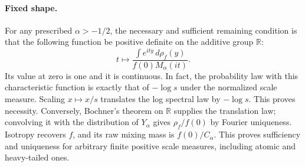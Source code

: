 \documentclass[11pt,a4paper]{article}
\numberwithin{equation}{section}
\begin{document}
\paragraph{Fixed shape.}
For any prescribed $\alpha>-1/2$, the necessary and sufficient
remaining condition is that the following function be positive definite
on the additive group $\mathbb R$:
\begin{equation}\label{eq:ball-divide}
 t\longmapsto\frac{\int e^{ity}\,d\rho_f(y)}{f(0)M_\alpha(it)}.
\end{equation}
Its value at zero is one and it is continuous. In fact, the probability
law with this characteristic function is exactly that of $-\log s$ under
the normalized scale measure. Scaling $x\mapsto x/s$ translates the
log spectral law by $-\log s$. This proves necessity. Conversely,
Bochner's theorem on $\mathbb R$ supplies the translation law;
convolving it with the distribution of $Y_\alpha$ gives
$\rho_f/f(0)$ by Fourier uniqueness. Isotropy recovers $f$,
and its raw mixing mass is $f(0)/C_\alpha$. This proves sufficiency and
uniqueness for arbitrary finite positive scale measures, including
atomic and heavy-tailed ones.
\end{document}
